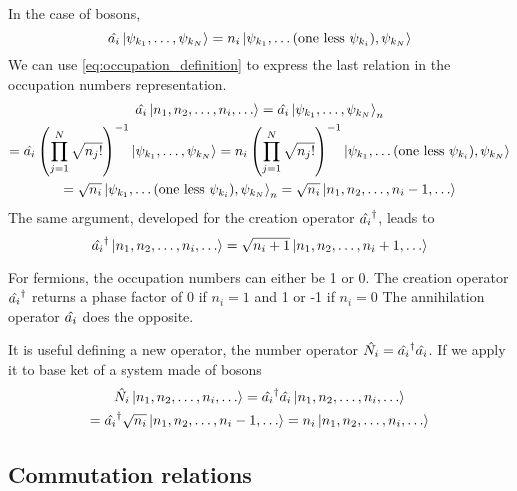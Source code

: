 In the case of bosons,
\begin{equation}
    \hat{a_i} \ket{\psi_{k_1}, \dots, \psi_{k_N}} = n_i \ket{\psi_{k_1}, \dots (\text{one less }\psi_{k_i}), \psi_{k_N}}
\end{equation}
We can use \cref{eq:occupation_definition} to express the last relation in the occupation numbers representation.
\begin{multline}
    \hat{a_i} \ket{n_1, n_2, \dots, n_i, \dots} =
    \hat{a_i} \ket{\psi_{k_1}, \dots, \psi_{k_N}}_n
    \\ = \hat{a_i} \left( \prod_{j=1}^N \sqrt{n_j!} \right)^{-1} \ket{\psi_{k_1}, \dots, \psi_{k_N}}
    = n_i \left( \prod_{j=1}^N \sqrt{n_j!} \right)^{-1} \ket{\psi_{k_1}, \dots (\text{one less }\psi_{k_i}), \psi_{k_N}}
    \\ = \sqrt{n_i} \ket{\psi_{k_1}, \dots (\text{one less }\psi_{k_i}), \psi_{k_N}}_n = \sqrt{n_i} \ket{n_1, n_2, \dots, n_i-1, \dots}
\end{multline}
The same argument, developed for the creation operator $\hat{a_i}^\dagger$, leads to
\begin{equation}
    \hat{a_i}^\dagger \ket{n_1, n_2, \dots, n_i, \dots} = \sqrt{n_i+1} \ket{n_1, n_2, \dots, n_i+1, \dots}
\end{equation}


For fermions, the occupation numbers can either be 1 or 0. The creation operator $\hat{a_i}^\dagger$ returns a phase factor of 0 if $n_i=1$ and 1 or -1 if $n_i=0$ The annihilation operator $\hat{a_i}$ does the opposite.

It is useful defining a new operator, the number operator $\hat{N_i} = \hat{a_i}^\dagger\hat{a_i}$. If we apply it to base ket of a system made of bosons
\begin{multline}
    \hat{N_i} \ket{n_1, n_2, \dots, n_i, \dots}
    = \hat{a_i}^\dagger\hat{a_i} \ket{n_1, n_2, \dots, n_i, \dots}
    \\ = \hat{a_i}^\dagger \sqrt{n_i} \ket{n_1, n_2, \dots, n_i-1, \dots}
    = n_i \ket{n_1, n_2, \dots, n_i, \dots}
\end{multline}

\subsection{Commutation relations}
